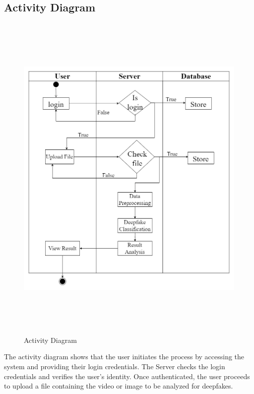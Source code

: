 
\subsection{Activity Diagram}
\begin{figure}[h]
    \centering
    \includegraphics[height=6.5in,width= 6in ]{img/activity diagram.drawio.png}
    \caption{Activity Diagram}
\end{figure}
\justify
The activity diagram shows that the user initiates the process by accessing the system and providing their login credentials. The Server checks the login credentials and verifies the user's identity. Once authenticated, the user proceeds to upload a file containing the video or image to be analyzed for deepfakes.
